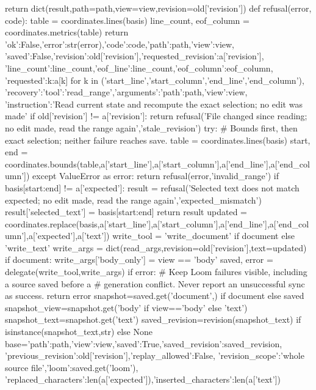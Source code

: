             return dict(result,path=path,view=view,revision=old['revision'])
        def refusal(error, code):
            table = coordinates.lines(basis)
            line_count, eof_column = coordinates.metrics(table)
            return {'ok':False,'error':str(error),'code':code,'path':path,'view':view,
                    'saved':False,'revision':old['revision'],'requested_revision':a['revision'],
                    'line_count':line_count,'eof_line':line_count,'eof_column':eof_column,
                    'requested':{k:a[k] for k in ('start_line','start_column','end_line','end_column')},
                    'recovery':{'tool':'read_range','arguments':{'path':path,'view':view},
                                'instruction':'Read current state and recompute the exact selection; no edit was made'}}
        if old['revision'] != a['revision']:
            return refusal('File changed since reading; no edit made, read the range again','stale_revision')
        try:
            # Bounds first, then exact selection; neither failure reaches save.
            table = coordinates.lines(basis)
            start, end = coordinates.bounds(table,a['start_line'],a['start_column'],a['end_line'],a['end_column'])
        except ValueError as error:
            return refusal(error,'invalid_range')
        if basis[start:end] != a['expected']:
            result = refusal('Selected text does not match expected; no edit made, read the range again','expected_mismatch')
            result['selected_text'] = basis[start:end]
            return result
        updated = coordinates.replace(basis,a['start_line'],a['start_column'],a['end_line'],a['end_column'],a['expected'],a['text'])
        write_tool = 'write_document' if document else 'write_text'
        write_args = dict(read_args,revision=old['revision'],text=updated)
        if document:
            write_args['body_only'] = view == 'body'
        saved, error = delegate(write_tool,write_args)
        if error:
            # Keep Loom failures visible, including a source saved before a
            # generation conflict. Never report an unsuccessful sync as success.
            return error
        snapshot=saved.get('document',{}) if document else saved
        snapshot_view=snapshot.get('body' if view=='body' else 'text')
        snapshot_text=snapshot.get('text')
        saved_revision=revision(snapshot_text) if isinstance(snapshot_text,str) else None
        base={'path':path,'view':view,'saved':True,'saved_revision':saved_revision,
              'previous_revision':old['revision'],'replay_allowed':False,
              'revision_scope':'whole source file','loom':saved.get('loom'),
              'replaced_characters':len(a['expected']),'inserted_characters':len(a['text'])}
